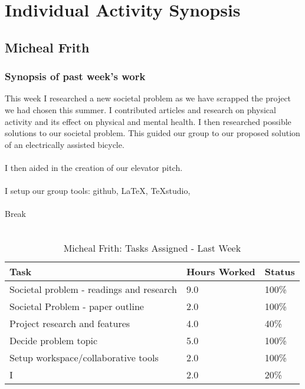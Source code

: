 \documentclass[12pt,article,compsoc]{IEEEtran}
\begin{document}
\clearpage
\section{Individual Activity Synopsis}
	\subsection{Micheal Frith}

	\subsubsection*{Synopsis of past week's work}

	This week I researched a new societal problem as we have scrapped the project we had chosen this summer. I contributed articles and research on physical activity and its effect on physical and mental health. I then researched possible solutions to our societal problem. This guided our group to our proposed solution of an electrically assisted bicycle.\\ \\ 
	I then aided in the creation of our elevator pitch.\\
	\\
	I setup our group tools: github, \LaTeX, TeXstudio,  \\
	\\
	Break\\
	\\

	\begin{table}[ht]
	\renewcommand{\arraystretch}{1.3}
		\caption{Micheal Frith: Tasks Assigned - Last Week}
		
		\label{Summary of Micheal Frith's activities: this week}
		
		\centering
		\begin{tabular}{p{5.5cm}|p{1cm}|p{1cm}} 
		\hline
		\bfseries 	Task		 		& \bfseries Hours Worked	& \bfseries Status	\\
		\hline\hline
					Societal problem - readings and research					& 9.0						& 100\%				\\	%
					Societal Problem - paper outline					& 2.0						& 100\%				\\
					Project research and features					& 4.0						& 40\%				\\	%
					Decide problem topic					& 5.0						& 100\%				\\	
					Setup workspace/collaborative tools					& 2.0						& 100\%				\\	%
					I					& 2.0						& 20\%				\\
		\hline
		\end{tabular}
	\end{table}
\end{document}
